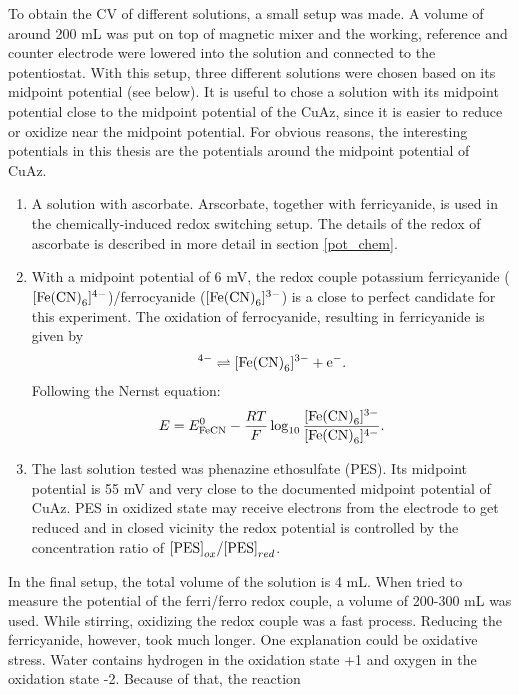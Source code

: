 \documentclass[twoside,single]{lion-msc}
\begin{document}
To obtain the CV of different solutions, a small setup was made. A volume of around 200 mL was put on top of magnetic mixer and the working, reference and counter electrode were lowered into the solution and connected to the potentiostat. With this setup, three different solutions were chosen based on its midpoint potential (see below). It is useful to chose a solution with its midpoint potential close to the midpoint potential of the CuAz, since it is easier to reduce or oxidize near the midpoint potential. For obvious reasons, the interesting potentials in this thesis are the potentials around the midpoint potential of CuAz.
\begin{enumerate}
\item A solution with ascorbate. Arscorbate, together with ferricyanide, is used in the chemically-induced redox switching setup. The details of the redox of ascorbate is described in more detail in section \ref{pot_chem}.
\item With a midpoint potential of 6 mV, the redox couple potassium ferricyanide ($[\textup{Fe(CN)}_{6}]^{4-}$)/ferrocyanide ($[\textup{Fe(CN)}_{6}]^{3-}$) is a close to perfect candidate for this experiment. The oxidation of ferrocyanide, resulting in ferricyanide is given by
\begin{equation}
[\textup{Fe(CN)}_{6}]^{4-}\rightleftharpoons[\textup{Fe(CN)}_{6}]^{3-} + \textup{e}^{-}.
\end{equation}
Following the Nernst equation:
\begin{equation}
E = E^{0}_{\textup{FeCN}} - \frac{RT}{F} \log_{10} \frac{[\textup{Fe(CN)}_{6}]^{3-}}{[\textup{Fe(CN)}_{6}]^{4-}}.
\end{equation}
\item The last solution tested was phenazine ethosulfate (PES). Its midpoint potential is 55 mV and very close to the documented midpoint potential of CuAz. PES in oxidized state may receive electrons from the electrode to get reduced and in closed vicinity the redox potential is controlled by the concentration ratio of $\textup{[PES]}_{ox}/\textup{[PES]}_{red}$. 
\end{enumerate}
In the final setup, the total volume of the solution is 4 mL. When tried to measure the potential of the ferri/ferro redox couple, a volume of 200-300 mL was used. While stirring, oxidizing the redox couple was a fast process. Reducing the ferricyanide, however, took much longer. One explanation could be oxidative stress. Water contains hydrogen in the oxidation state +1 and oxygen in the oxidation state -2. Because of that, the reaction
\end{document}
